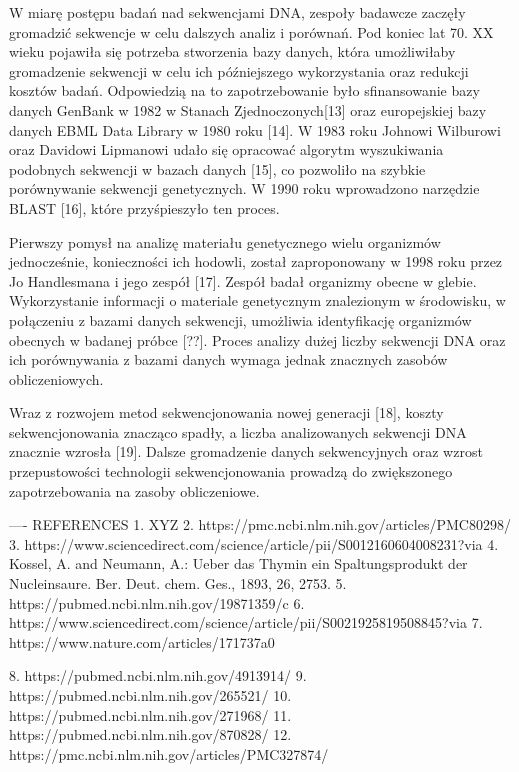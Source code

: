 
W miarę postępu badań nad sekwencjami DNA, zespoły badawcze zaczęły gromadzić sekwencje 
w celu dalszych analiz i porównań. Pod koniec lat 70. XX wieku pojawiła się potrzeba 
stworzenia bazy danych, która umożliwiłaby gromadzenie sekwencji w celu ich późniejszego 
wykorzystania oraz redukcji kosztów badań. Odpowiedzią na to zapotrzebowanie było 
sfinansowanie bazy danych GenBank w 1982 w Stanach Zjednoczonych[13] oraz 
europejskiej bazy danych EBML Data Library w 1980 roku [14]. W 1983 roku 
Johnowi Wilburowi oraz Davidowi Lipmanowi udało się opracować algorytm wyszukiwania
podobnych sekwencji w bazach danych [15], co pozwoliło na szybkie porównywanie sekwencji 
genetycznych. W 1990 roku wprowadzono narzędzie BLAST [16], które przyśpieszyło ten 
proces.

Pierwszy pomysł na analizę materiału genetycznego wielu organizmów jednocześnie,
konieczności ich hodowli, został zaproponowany w 1998 roku przez Jo Handlesmana i 
jego zespół [17]. Zespół badał organizmy obecne w glebie.
Wykorzystanie informacji o materiale genetycznym znalezionym w 
środowisku, w połączeniu z bazami danych sekwencji, umożliwia identyfikację organizmów 
obecnych w badanej próbce [??]. Proces analizy dużej liczby sekwencji DNA oraz ich 
porównywania z bazami danych wymaga jednak znacznych zasobów obliczeniowych.

Wraz z rozwojem metod sekwencjonowania nowej generacji [18], koszty sekwencjonowania 
znacząco spadły, a liczba analizowanych sekwencji DNA znacznie wzrosła [19]. Dalsze 
gromadzenie danych sekwencyjnych oraz wzrost przepustowości technologii sekwencjonowania 
prowadzą do zwiększonego zapotrzebowania na zasoby obliczeniowe.


---- REFERENCES 
1. XYZ
2. https://pmc.ncbi.nlm.nih.gov/articles/PMC80298/
3. https://www.sciencedirect.com/science/article/pii/S0012160604008231?via%
4. Kossel, A. and Neumann, A.: Ueber das Thymin ein Spaltungsprodukt der Nucleinsaure. Ber. Deut. chem. Ges., 1893, 26, 2753.
5. https://pubmed.ncbi.nlm.nih.gov/19871359/c
6. https://www.sciencedirect.com/science/article/pii/S0021925819508845?via%
7. https://www.nature.com/articles/171737a0

8. https://pubmed.ncbi.nlm.nih.gov/4913914/
9. https://pubmed.ncbi.nlm.nih.gov/265521/
10. https://pubmed.ncbi.nlm.nih.gov/271968/
11. https://pubmed.ncbi.nlm.nih.gov/870828/
12. https://pmc.ncbi.nlm.nih.gov/articles/PMC327874/

